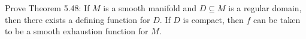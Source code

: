 Prove Theorem 5.48: If $M$ is a smooth manifold and $D \subseteq M$ is a regular domain, then there exists a defining function for $D$.  If $D$ is compact, then $f$ can be taken to be a smooth exhaustion function for $M$.